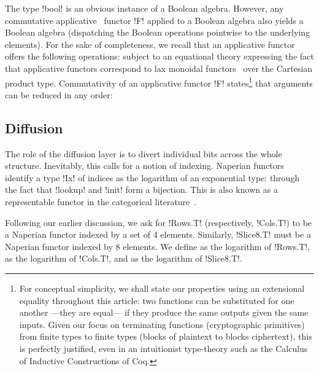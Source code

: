 \documentclass[draft,english]{jflart}
\begin{document}
The type \coqe!bool! is an obvious instance of a Boolean algebra.
However, any commutative applicative~\citep{mcbride:applicative}
functor \coqe!F! applied to a Boolean algebra also yields a Boolean
algebra (dispatching the Boolean operations pointwise to the
underlying elements). For the sake of completeness, we recall that an
applicative functor offers the following operations:
%
%
subject to an equational theory expressing the fact that applicative
functors correspond to lax monoidal
functors~\citep{maclane:working-categorist} over the Cartesian product
type. Commutativity of an applicative functor \coqe!F!
states\footnote{For conceptual simplicity, we shall state our
properties using an extensional equality throughout this article: two
functions can be substituted for one another ---they are equal--- if
they produce the same outputs given the same inputs. Given our focus
on terminating functions (cryptographic primitives) from finite types
to finite types (blocks of plaintext to blocks ciphertext), this is
perfectly justified, even in an intuitionist type-theory such as the
Calculus of Inductive Constructions of Coq.} that arguments can be
reduced in any order:
%



\subsection{Diffusion}


The role of the diffusion layer is to divert individual bits across the
whole structure. Inevitably, this calls for a notion of indexing.
Naperian functors~\citep{hancock:napierian} identify a type \coqe!Ix! of
indices as the logarithm of an exponential type:
%
%
through the fact that \coqe!lookup! and \coqe!init! form a bijection.
This is also known as a representable functor in the categorical
literature~\citep{maclane:working-categorist}.


Following our earlier discussion, we ask for \coqe!Rows.T!
(respectively, \coqe!Cols.T!) to be a Naperian functor indexed by a
set of 4 elements. Similarly, \coqe!Slice8.T! must be a Naperian
functor indexed by 8 elements. We define
%
%
as the logarithm of \coqe!Rows.T!,
%
%
as the logarithm of \coqe!Cols.T!, and
%
%
as the logarithm of \coqe!Slice8.T!.
\end{document}
